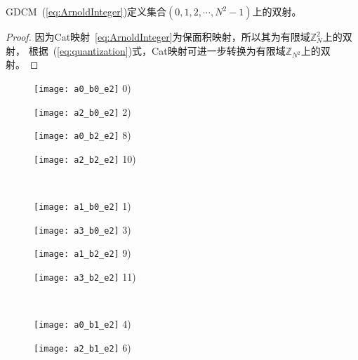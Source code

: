 \begin{Property}
GDCM~(\ref{eq:ArnoldInteger})定义集合$(0, 1, 2, \cdots, N^{2}-1)$上的双射。
\label{prop:bijective}
\end{Property}
\begin{proof}
因为Cat映射~\eqref{eq:ArnoldInteger}为保面积映射，所以其为有限域$\mathbb{Z}^2_{N}$上的双射，
根据~(\ref{eq:quantization})式，Cat映射可进一步转换为有限域$\mathbb{Z}_{N^2}$上的双射。\qedsymbol
\end{proof}

\begin{figure}[!htb]
\centering
\begin{minipage}[b]{\FourImW}
\centering
\texttt{[image: a0\_b0\_e2]}
0)
\end{minipage}
\begin{minipage}[b]{\FourImW}
\centering
\texttt{[image: a2\_b0\_e2]}
2)
\end{minipage}
\begin{minipage}[b]{\FourImW}
\centering
\texttt{[image: a0\_b2\_e2]}
8)
\end{minipage}
\begin{minipage}[b]{\FourImW}
\centering
\texttt{[image: a2\_b2\_e2]}
10)
\end{minipage}\\
\begin{minipage}[b]{\FourImW}
\centering
\texttt{[image: a1\_b0\_e2]}
1)
\end{minipage}
\begin{minipage}[b]{\FourImW}
\centering
\texttt{[image: a3\_b0\_e2]}
3)
\end{minipage}
\begin{minipage}[b]{\FourImW}
\centering
\texttt{[image: a1\_b2\_e2]}
9)
\end{minipage}
\begin{minipage}[b]{\FourImW}
\centering
\texttt{[image: a3\_b2\_e2]}
11)
\end{minipage}  \\
\begin{minipage}[b]{\FourImW}
\centering
\texttt{[image: a0\_b1\_e2]}
4)
\end{minipage}
\begin{minipage}[b]{\FourImW}
\centering
\texttt{[image: a2\_b1\_e2]}
6)
\end{minipage}
\begin{minipage}[b]{\FourImW}

\end{minipage}
\end{figure}
